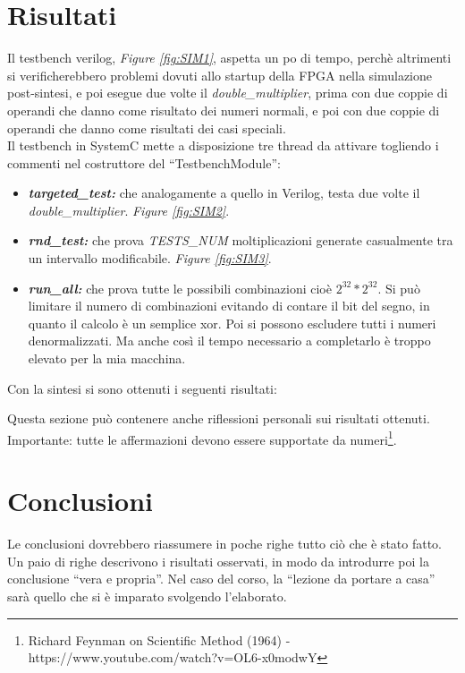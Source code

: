 \documentclass[]{IEEEtran}
\begin{document}
\section{Risultati}
Il testbench verilog, {\it Figure \ref{fig:SIM1}}, aspetta un po di tempo, perchè altrimenti si verificherebbero problemi dovuti allo startup della FPGA nella simulazione post-sintesi, e poi esegue due volte il {\it double\_multiplier}, prima con due coppie di operandi che danno come risultato dei numeri normali, e poi con due coppie di operandi che danno come risultati dei casi speciali. \\

Il testbench in SystemC mette a disposizione tre thread da attivare togliendo i commenti nel costruttore del ``TestbenchModule'':
\begin{itemize}
\item {\it\bf targeted\_test:} che analogamente a quello in Verilog, testa due volte il {\it double\_multiplier}. {\it Figure \ref{fig:SIM2}}.
\item {\it\bf rnd\_test:} che prova {\it TESTS\_NUM} moltiplicazioni generate casualmente tra un intervallo modificabile. {\it Figure \ref{fig:SIM3}}.
\item {\it\bf run\_all:} che prova tutte le possibili combinazioni cioè \(2^{32} * 2^{32}\). Si può limitare il numero di combinazioni evitando di contare il bit del segno, in quanto il calcolo è un semplice xor. Poi si possono escludere tutti i numeri denormalizzati. Ma anche così il tempo necessario a completarlo è troppo elevato per la mia macchina.
\end{itemize}
Con la sintesi si sono ottenuti i seguenti risultati:


















Questa sezione può contenere anche riflessioni personali sui risultati ottenuti. Importante: tutte le affermazioni devono essere supportate da numeri\footnote{Richard Feynman on Scientific Method (1964) -\\ https://www.youtube.com/watch?v=OL6-x0modwY}.

\section{Conclusioni}
Le conclusioni dovrebbero riassumere in poche righe  tutto ciò che è stato fatto. Un paio di righe descrivono i risultati osservati, in modo da introdurre poi la conclusione ``vera e propria''. Nel caso del corso, la ``lezione da portare a casa'' sarà quello che si è imparato svolgendo l'elaborato.
\end{document}
